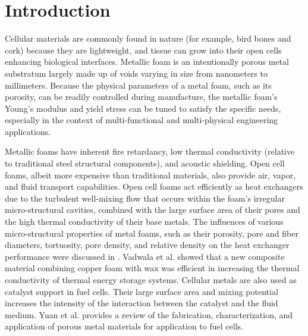 \documentclass[review]{elsarticle}
\begin{document}
\linenumbers

\section{Introduction}

Cellular materials are commonly found in nature (for example, bird bones and cork) because they are lightweight, and tissue can grow into their open cells enhancing biological interfaces. Metallic foam is an intentionally porous metal substratum largely made up of voids varying in size from nanometers to millimeters. Because the physical parameters of a metal foam, such as its porosity, can be readily controlled during manufacture, the metallic foam’s Young’s modulus and yield stress can be tuned to satisfy the specific needs, especially in the context of multi-functional and multi-physical engineering applications.

Metallic foams have inherent fire retardancy, low thermal conductivity (relative to traditional steel structural components), and acoustic shielding. Open cell foams, albeit more expensive than traditional materials, also provide air, vapor, and fluid transport capabilities. Open cell foams act efficiently as heat exchangers due to the turbulent well-mixing flow that occurs within the foam’s irregular micro-structural cavities, combined with the large surface area of their pores and the high thermal conductivity of their base metals. The influences of various micro-structural properties of metal foams, such as their porosity, pore and fiber diameters, tortuosity, pore density, and relative density on the heat exchanger performance were discussed in \cite{MahjoobKambiz2008}. Vadwala et al. \cite{Vadwala2011} showed that a new composite material combining copper foam with wax was efficient in increasing the thermal conductivity of thermal energy storage systems. Cellular metals are also used as catalyst support in fuel cells. Their large surface area and mixing potential increases the intensity of the interaction between the catalyst and the fluid medium. Yuan et al. \cite{Yuanetal2012} provides a review of the fabrication, characterization, and application of porous metal materials for application to fuel cells.
\end{document}
